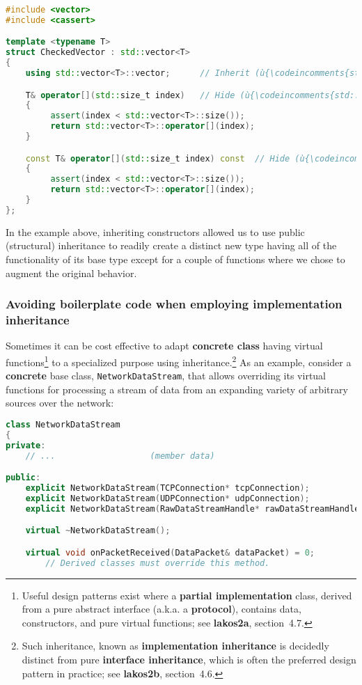 \begin{lstlisting}[language=C++]
#include <vector>
#include <cassert>

template <typename T>
struct CheckedVector : std::vector<T>
{
    using std::vector<T>::vector;      // Inherit (ù{\codeincomments{std::vector}}ù)'s constructors.

    T& operator[](std::size_t index)   // Hide (ù{\codeincomments{std::vector}}ù)'s index operator.
    {
         assert(index < std::vector<T>::size());
         return std::vector<T>::operator[](index);
    }

    const T& operator[](std::size_t index) const  // Hide (ù{\codeincomments{const}}ù) index operator.
    {
         assert(index < std::vector<T>::size());
         return std::vector<T>::operator[](index);
    }
};
\end{lstlisting}
    
\noindent In the example above, inheriting constructors allowed us to use public
(structural) inheritance to readily create a distinct new type having
all of the functionality of its base type except for a couple of
functions where we chose to augment the original behavior.

\subsubsection[Avoiding boilerplate code when employing implementation inheritance]{Avoiding boilerplate code when employing implementation inheritance}\label{avoiding-boilerplate-code-when-employing-implementation-inheritance}

Sometimes it can be cost effective to adapt \textbf{concrete class}
having virtual functions{\cprotect\footnote{Useful design patterns
exist where a \textbf{partial implementation} class, derived from a
pure abstract interface (a.k.a. a \textbf{protocol}), contains data,
constructors, and pure virtual functions; see
  \textbf{lakos2a}, section~4.7.}} to a specialized purpose
using inheritance.{\cprotect\footnote{Such inheritance, known as
\textbf{implementation inheritance} is decidedly distinct from pure
\textbf{interface inheritance}, which is often the preferred design
  pattern in practice; see \textbf{{lakos2b}}, section~4.6.}}
As an example, consider a \textbf{concrete} base class,
\texttt{NetworkDataStream}, that allows overriding its virtual functions
for processing a stream of data from an expanding variety of arbitrary
sources over the network:

\begin{lstlisting}[language=C++]
class NetworkDataStream
{
private:
    // ...                   (member data)

public:
    explicit NetworkDataStream(TCPConnection* tcpConnection);
    explicit NetworkDataStream(UDPConnection* udpConnection);
    explicit NetworkDataStream(RawDataStreamHandle* rawDataStreamHandle);

    virtual ~NetworkDataStream();

    virtual void onPacketReceived(DataPacket& dataPacket) = 0;
        // Derived classes must override this method.
\end{lstlisting}
    
